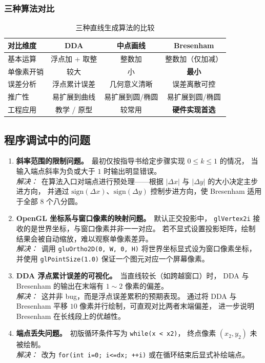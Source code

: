 \documentclass[a4paper,12pt]{ctexart}
\begin{document}
\subsubsection{三种算法对比}

\begin{table}[H]
\centering
\renewcommand{\arraystretch}{1.3}
\begin{tabular}{lccc}
\toprule
对比维度 & DDA & 中点画线 & Bresenham \\
\midrule
基本运算  & 浮点加 + 取整 & 整数加 & 整数加（仅加减）\\
单像素开销 & 较大 & 小 & \textbf{最小} \\
误差分析 & 浮点累计误差 & 几何意义清晰 & 误差离散可控 \\
推广性 & 易扩展到曲线 & 易扩展到圆/椭圆 & 易扩展到圆/椭圆 \\
工程应用 & 教学 / 原型 & 较常用 & \textbf{硬件实现首选} \\
\bottomrule
\end{tabular}
\caption{三种直线生成算法的比较}
\end{table}

\subsection{程序调试中的问题}

\begin{enumerate}[leftmargin=2em,itemsep=0.4em]
    \item \textbf{斜率范围的限制问题。}\ 最初仅按指导书给定步骤实现 $0\le k\le 1$ 的情况，
        当输入端点斜率为负或大于 $1$ 时输出明显错误。\\
        \textit{解决：}\ 在算法入口对端点进行预处理——根据 $|\Delta x|$ 与 $|\Delta y|$ 的大小决定主步进方向，
        并通过 $\mathrm{sign}(\Delta x)$、$\mathrm{sign}(\Delta y)$ 控制步进方向，使 Bresenham 适用于全部 8 个八分圆。

    \item \textbf{OpenGL 坐标系与窗口像素的映射问题。}\ 默认正交投影中，
        \texttt{glVertex2i} 接收的是世界坐标，与窗口像素并非一一对应。
        若不显式设置投影矩阵，绘制结果会被自动缩放，难以观察单像素差异。\\
        \textit{解决：}\ 调用 \texttt{gluOrtho2D(0, W, 0, H)} 将世界坐标显式设为窗口像素坐标，
        并使用 \texttt{glPointSize(1.0)} 保证一个图元对应一个屏幕像素。

    \item \textbf{DDA 浮点累计误差的可视化。}\ 当直线较长（如跨越窗口）时，
        DDA 与 Bresenham 的输出在末端有 $1\sim 2$ 像素的偏差。\\
        \textit{解决：}\ 这并非 bug，而是浮点误差累积的预期表现。
        通过将 DDA 与 Bresenham 平移 $10$ 像素并行绘制，可直观对比两者末端偏差，
        进一步说明 Bresenham 在长线段上的优越性。

    \item \textbf{端点丢失问题。}\ 初版循环条件写为 \texttt{while(x < x2)}，
        终点像素 $(x_2,y_2)$ 未被绘制。\\
        \textit{解决：}\ 改为 \texttt{for(int i=0; i<=dx; ++i)} 或在循环结束后显式补绘端点。
\end{enumerate}
\end{document}
